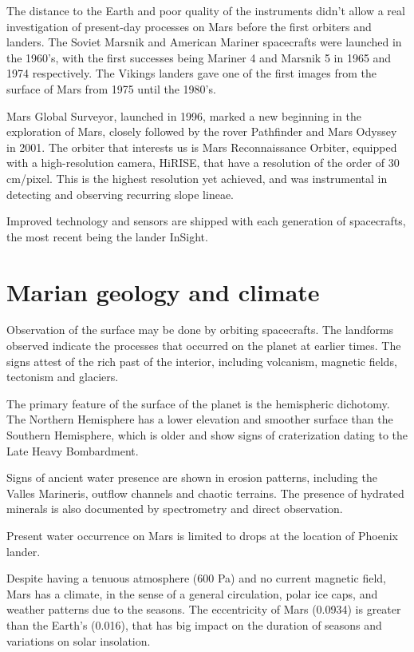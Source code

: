 \documentclass{report}
\begin{document}
The distance to the Earth and poor quality of the instruments didn't allow a real investigation of present-day processes on Mars before the first orbiters and landers. The Soviet Marsnik and American Mariner spacecrafts were launched in the 1960's, with the first successes being Mariner 4 and Marsnik 5 in 1965 and 1974 respectively. 
The Vikings landers gave one of the first images from the surface of Mars from 1975 until the 1980's.

Mars Global Surveyor, launched in 1996, marked a new beginning in the exploration of Mars, closely followed by the rover Pathfinder and Mars Odyssey in 2001.
The orbiter that interests us is Mars Reconnaissance Orbiter, equipped with a high-resolution camera, HiRISE, that have a resolution of the order of 30 cm/pixel. 
This is the highest resolution yet achieved, and was instrumental in detecting and observing recurring slope lineae.

Improved technology and sensors are shipped with each generation of spacecrafts, the most recent being the lander InSight.

\section{Marian geology and climate}
Observation of the surface may be done by orbiting spacecrafts. The landforms observed indicate the processes that occurred on the planet at earlier times. The signs attest of the rich past of the interior, including volcanism, magnetic fields, tectonism and glaciers.

The primary feature of the surface of the planet is the hemispheric dichotomy. 
The Northern Hemisphere has a lower elevation and smoother surface than the Southern Hemisphere, which is older and show signs of craterization dating to the Late Heavy Bombardment.

Signs of ancient water presence are shown in erosion patterns, including the Valles Marineris, outflow channels and chaotic terrains. The presence of hydrated minerals is also documented by spectrometry and direct observation. 

Present water occurrence on Mars is limited to drops at the location of Phoenix lander.

Despite having a tenuous atmosphere (600 Pa) and no current magnetic field, Mars has a climate, in the sense of a general circulation, polar ice caps, and weather patterns due to the seasons. 
The eccentricity of Mars (0.0934) is greater than the Earth's (0.016), that has big impact on the duration of seasons and variations on solar insolation. 
\end{document}
